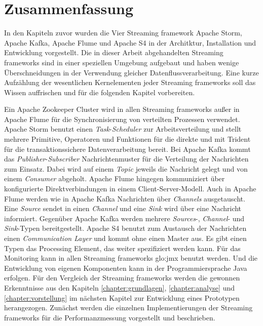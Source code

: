 \section{Zusammenfassung}

In den Kapiteln zuvor wurden die Vier Streaming framework Apache Storm, Apache Kafka, Apache Flume und Apache S4 in der Architktur, Installation und Entwicklung vorgestellt. Die in dieser Arbeit abgehandelten Streaming frameworks sind in einer speziellen Umgebung aufgebaut und haben wenige Überschneidungen in der Verwendung gleicher Datenflussverarbeitung. Eine kurze Aufzählung der wesentlichen Kernelementen jeder Streaming frameworks soll das Wissen auffrischen und für die folgenden Kapitel vorbereiten.

Ein Apache Zookeeper Cluster wird in allen Streaming frameworks außer in Apache Flume für die Synchronisierung von verteilten Prozessen verwendet. 
Apache Storm benutzt einen \textit{Task}-\textit{Scheduler} zur Arbeitsverteilung und stellt mehrere Primitive, Operatoren und Funktionen für die direkte und mit Trident für die transaktionssichere Datenverarbeitung bereit. Bei Apache Kafka kommt das \textit{Publisher}-\textit{Subscriber} Nachrichtenmuster für die Verteilung der Nachrichten zum Einsatz. Dabei wird auf einem \textit{Topic} jeweils die Nachricht gelegt und von einem \textit{Consumer} abgeholt. Apache Flume hingegen kommuniziert über konfigurierte Direktverbindungen in einem Client-Server-Modell. Auch in Apache Flume werden wie in Apache Kafka Nachrichten über \textit{Channels} ausgetauscht. Eine \textit{Source} sendet in einen \textit{Channel} und eine \textit{Sink} wird über eine Nachricht informiert. Gegenüber Apache Kafka werden mehrere \textit{Sources}-, \textit{Channel}- und \textit{Sink}-Typen bereitgestellt. Apache S4 benutzt zum Austausch der Nachrichten einen \textit{Communication Layer} und kommt ohne einen Master aus. Es gibt einen Typen das Processing Element, das weiter spezifiziert werden kann. Für das Monitoring kann in allen Streaming frameworks \gls{glo:jmx} benutzt werden. Und die Entwicklung von eigenen Komponenten kann in der Programmiersprache Java erfolgen. Für den Vergleich der Streaming frameworks werden die gewonnen Erkenntnisse aus den Kapiteln \ref{chapter:grundlagen}, \ref{chapter:analyse} und \ref{chapter:vorstellung} im nächsten Kapitel zur Entwicklung eines Prototypen herangezogen. Zunächst werden die einzelnen Implementierungen der Streaming frameworks für die Performanzmessung vorgestellt und beschrieben.